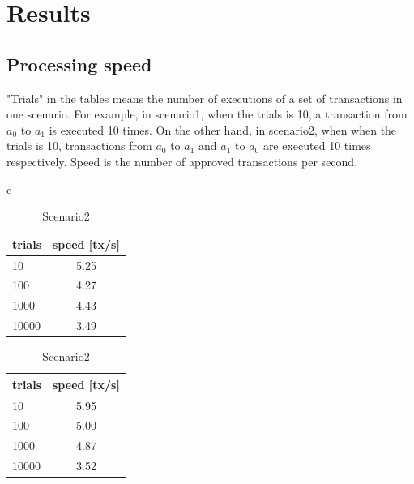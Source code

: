 \documentclass[a4paper, oneside]{discothesis}
\begin{document}
\section{Results}

\subsection{Processing speed}
"Trials" in the tables means the number of executions of a set of transactions in one scenario.
For example, in scenario1, when the trials is 10, a transaction from $a_0$ to $a_1$
is executed 10 times.
On the other hand, in scenario2, when when the trials is 10,
transactions from $a_0$ to $a_1$ and $a_1$ to $a_0$ are executed 10 times respectively.
Speed is the number of approved transactions per second.

\begin{table}[t]
    \begin{center}
        \begin{tabular}{c}

            \begin{minipage}{0.5\hsize}
                \begin{center}
                    \caption{Scenario1}
                    \label{tbl:scenario1}
                    \begin{tabular}{|l|c|} \hline
                        trials & speed [tx/s]\\ \hline \hline
                        10 & 5.25 \\
                        100 & 4.27 \\
                        1000 & 4.43 \\ 
                        10000 & 3.49 \\ \hline
                    \end{tabular}
                \end{center}
            \end{minipage}

            \begin{minipage}{0.5\hsize}
                \begin{center}
                    \caption{Scenario2}
                    \label{tbl:scenario2}
                    \begin{tabular}{|l|c|} \hline
                        trials & speed [tx/s]\\ \hline \hline
                        10 &  5.95 \\
                        100 & 5.00 \\
                        1000 & 4.87 \\
                        10000 & 3.52\\ \hline
                    \end{tabular}
                \end{center}
            \end{minipage}

        \end{tabular}
    \end{center}
\end{table}
\end{document}
